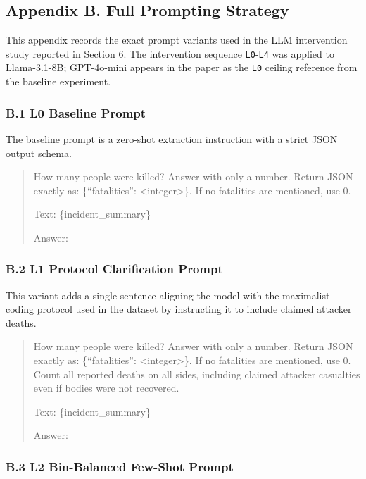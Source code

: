 \documentclass[
  11pt,
]{article}
\begin{document}
\subsection{Appendix B. Full Prompting
Strategy}\label{appendix-b.-full-prompting-strategy}

This appendix records the exact prompt variants used in the LLM
intervention study reported in Section 6. The intervention sequence
\texttt{L0}-\texttt{L4} was applied to Llama-3.1-8B; GPT-4o-mini appears
in the paper as the \texttt{L0} ceiling reference from the baseline
experiment.

\subsubsection{B.1 L0 Baseline Prompt}\label{b.1-l0-baseline-prompt}

The baseline prompt is a zero-shot extraction instruction with a strict
JSON output schema.

\begin{quote}
How many people were killed? Answer with only a number. Return JSON
exactly as: \{``fatalities'': \textless integer\textgreater\}. If no
fatalities are mentioned, use 0.

Text: \{incident\_summary\}

Answer:
\end{quote}

\subsubsection{B.2 L1 Protocol Clarification
Prompt}\label{b.2-l1-protocol-clarification-prompt}

This variant adds a single sentence aligning the model with the
maximalist coding protocol used in the dataset by instructing it to
include claimed attacker deaths.

\begin{quote}
How many people were killed? Answer with only a number. Return JSON
exactly as: \{``fatalities'': \textless integer\textgreater\}. If no
fatalities are mentioned, use 0. Count all reported deaths on all sides,
including claimed attacker casualties even if bodies were not recovered.

Text: \{incident\_summary\}

Answer:
\end{quote}

\subsubsection{B.3 L2 Bin-Balanced Few-Shot
Prompt}\label{b.3-l2-bin-balanced-few-shot-prompt}
\end{document}

